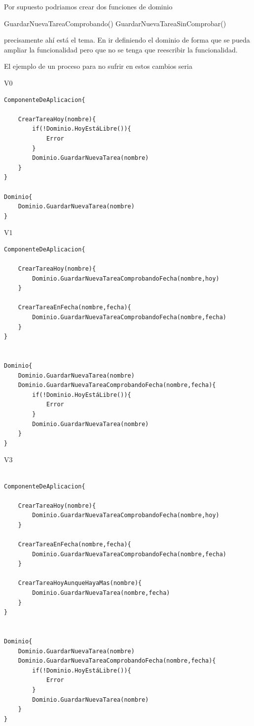 Por supuesto podriamos crear dos funciones de dominio

GuardarNuevaTareaComprobando()
GuardarNuevaTareaSinComprobar()

precisamente ahí está el tema. En ir definiendo el dominio de forma que se pueda ampliar la funcionalidad pero que no se tenga que reescribir la funcionalidad.

El ejemplo de un proceso para no sufrir en estos cambios seria

V0

\begin{verbatim}
ComponenteDeAplicacion{

    CrearTareaHoy(nombre){
        if(!Dominio.HoyEstáLibre()){
            Error
        }
        Dominio.GuardarNuevaTarea(nombre)
    }
}

Dominio{
    Dominio.GuardarNuevaTarea(nombre)
}

\end{verbatim}

V1

\begin{verbatim}
ComponenteDeAplicacion{

    CrearTareaHoy(nombre){
        Dominio.GuardarNuevaTareaComprobandoFecha(nombre,hoy)
    }

    CrearTareaEnFecha(nombre,fecha){
        Dominio.GuardarNuevaTareaComprobandoFecha(nombre,fecha)
    }
}


Dominio{
    Dominio.GuardarNuevaTarea(nombre)
    Dominio.GuardarNuevaTareaComprobandoFecha(nombre,fecha){
        if(!Dominio.HoyEstáLibre()){
            Error
        }
        Dominio.GuardarNuevaTarea(nombre)
    }
}

\end{verbatim}

V3

\begin{verbatim}

ComponenteDeAplicacion{

    CrearTareaHoy(nombre){
        Dominio.GuardarNuevaTareaComprobandoFecha(nombre,hoy)
    }

    CrearTareaEnFecha(nombre,fecha){
        Dominio.GuardarNuevaTareaComprobandoFecha(nombre,fecha)
    }

    CrearTareaHoyAunqueHayaMas(nombre){
        Dominio.GuardarNuevaTarea(nombre,fecha)
    }
}


Dominio{
    Dominio.GuardarNuevaTarea(nombre)
    Dominio.GuardarNuevaTareaComprobandoFecha(nombre,fecha){
        if(!Dominio.HoyEstáLibre()){
            Error
        }
        Dominio.GuardarNuevaTarea(nombre)
    }
}
\end{verbatim}

